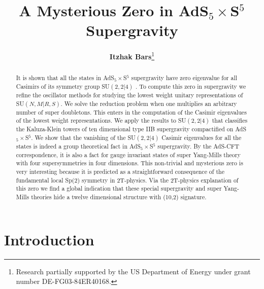 \documentclass[a4paper,aps,preprint,nofootinbib]{revtex4}
\begin{document}
\bigskip


\title{{\Large A Mysterious Zero in AdS$_{5}\times$S$^{5}$ Supergravity }}\bigskip

\author{\textbf{{\large {Itzhak Bars}}}{\footnote{
Research partially supported by the US Department of Energy under
grant number DE-FG03-84ER40168.}}}

\address{\large{Department of Physics and Astronomy\\
 University of Southern California,
Los Angeles, CA 90089-0484}} %

\begin{abstract}
It is shown that all the states in AdS$_{5}\times$S$^{5}$
supergravity have zero eigenvalue for all Casimirs of its symmetry
group SU$( 2,2|4)$ . To compute this zero in supergravity we
refine the oscillator methods for studying the lowest weight
unitary representations of SU$(N,M|R,S)$. We solve the reduction
problem when one multiplies an arbitrary number of super
doubletons. This enters in the computation of the Casimir
eigenvalues of the lowest weight representations. We apply the results to SU$%
(2,2|4)$ that classifies the Kaluza-Klein towers of ten
dimensional type IIB supergravity compactified on
AdS$_{5}\times$S$^{5}.$ We show that the vanishing of the
SU$(2,2|4)$ Casimir eigenvalues for all the states is indeed a
group theoretical fact in AdS$_{5}\times$S$^{5}$ supergravity. By
the AdS-CFT correspondence, it is also a fact for gauge invariant
states of super Yang-Mills theory with four supersymmetries in
four dimensions. This non-trivial and mysterious zero is very
interesting because it is predicted as a straightforward
consequence of the fundamental local Sp(2) symmetry in 2T-physics.
Via the 2T-physics explanation of this zero we find a global
indication that these special supergravity and super Yang-Mills
theories hide a twelve dimensional structure with (10,2)
signature.
\end{abstract}

\maketitle

\section{Introduction}
\end{document}
